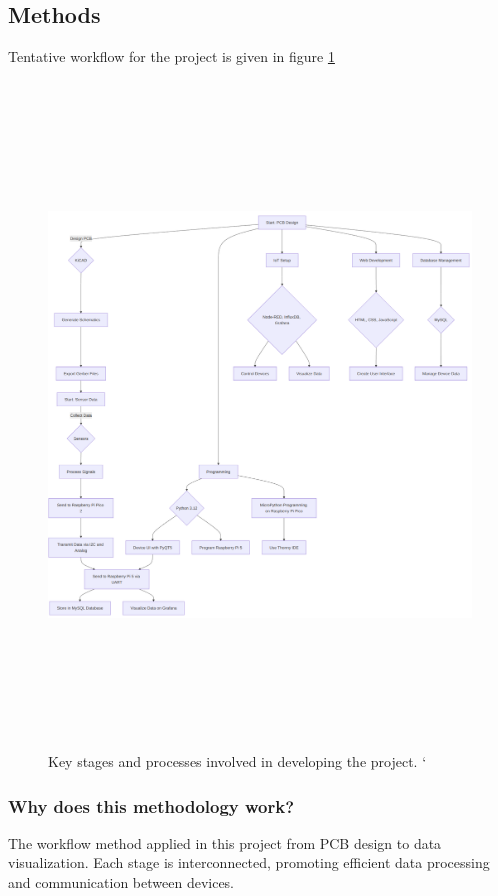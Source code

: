 \documentclass{article}
\begin{document}
\subsection{Methods}\label{methods}

Tentative workflow for the project is given in figure \ref{fig:fig4}

\begin{figure}
  \centering
  \includegraphics[width=500pt,height=500pt]{images/clipboard-1005866267.png} %
  \caption{Key stages and processes involved in developing the project. `}
  \label{fig:fig4}
\end{figure}

\subsubsection{Why does this methodology
work?}\label{why-does-this-methodology-work}

The workflow method applied in this project from PCB design to data
visualization. Each stage is interconnected, promoting efficient data
processing and communication between devices.
\end{document}
